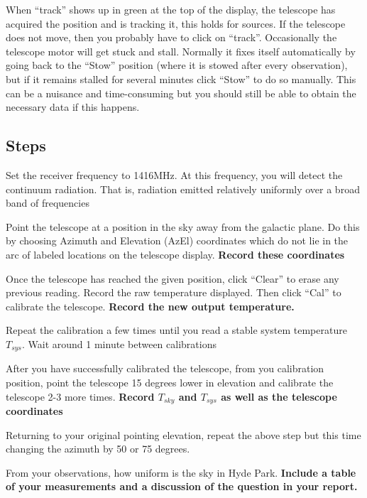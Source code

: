 When “track” shows up in green at the top of the display, the telescope has
acquired the position and is tracking it, this holds for sources. If the telescope
does not move, then you probably have to click on “track”.
Occasionally the telescope motor will get stuck and stall. Normally it fixes
itself automatically by going back to the “Stow” position (where it is stowed after
every observation), but if it remains stalled for several minutes click “Stow” to do
so manually. This can be a nuisance and time-consuming but you should still be
able to obtain the necessary data if this happens.

\subsection{Steps}
\begin{steps}
	\item Set the receiver frequency to 1416MHz. At this frequency, you will detect the continuum radiation. That is, radiation emitted relatively uniformly over a broad band of frequencies  
	
	\item Point the telescope at a position in the sky away from the galactic plane. Do this by choosing Azimuth and Elevation (AzEl) coordinates which do not lie in the arc of labeled locations on the telescope display. \textbf{Record these coordinates}
	
	\item Once the telescope has reached the given position, click ``Clear'' to erase any previous reading. Record the raw temperature displayed. Then click ``Cal'' to calibrate the telescope. \textbf{Record the new output temperature.} 
	
	\item Repeat the calibration a few times until you read a stable system temperature $T_{sys}$. Wait around 1 minute between calibrations
	
	\item After you have successfully calibrated the telescope, from you calibration position, point the telescope 15 degrees lower in elevation and calibrate the telescope 2-3 more times. \textbf{Record $T_{sky}$ and $T_{sys}$ as well as the telescope coordinates}
	
	\item Returning to your original pointing elevation, repeat the above step but this time changing the azimuth by 50 or 75 degrees.
	
	\item From your observations, how uniform is the sky in Hyde Park. \textbf{Include a table of your measurements and a discussion of the question in your report.}
\end{steps}